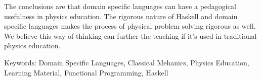 The conclusions are that domain specific languages can have a pedagogical usefulness in physics education. The rigorous nature of Haskell and domain specific languages makes the process of physical problem solving rigorous as well. We believe this way of thinking can further the teaching if it's used in traditional physics education.













\vfill
Keywords: Domain Specific Languages, Classical Mehanics, Physics Education, Learning Material, Functional Programming, Haskell


\newpage				%
\thispagestyle{empty}
\mbox{}
